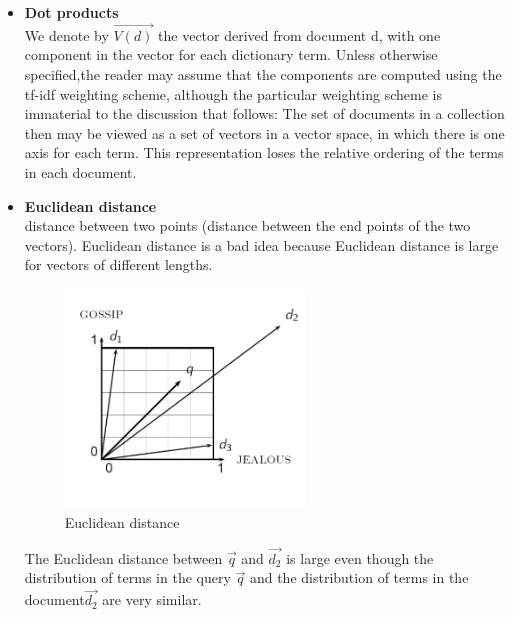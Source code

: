 \begin{itemize}
     \item \textbf{Dot products}\\
     We denote by $\vec{V(d)}$ the vector derived from document d, with one component in the vector for each dictionary term. Unless otherwise specified,the reader may assume that the components are computed using the tf-idf weighting scheme, although the particular weighting scheme is immaterial to the discussion that follows: 
     The set of documents in a collection then may be viewed as a set of vectors in a vector space, in which there is one axis for each term.              This representation loses the relative ordering of the terms in each document.
      
     
\end{itemize}

\begin{itemize}
     \item \textbf{Euclidean distance}\\
     distance between two points (distance between the end points of the two vectors). 
     Euclidean distance is a bad idea because Euclidean distance is large for vectors of different lengths.
     
     
\begin{figure}[H]%
    \center%
    \includegraphics[width=0.6\textwidth]{images/shimaa/Euclidean distance.png}
    \caption[Euclidean distance]{Euclidean distance}\label{fig:Euclidean distance}%
   \end{figure}

   The Euclidean distance between $\vec{q}$ and $\vec{d_2}$  is large even though the distribution of terms in the query $\vec{q}$ and the distribution of terms in the document$\vec{d_2}$ are very similar.  
  
\end{itemize}   

